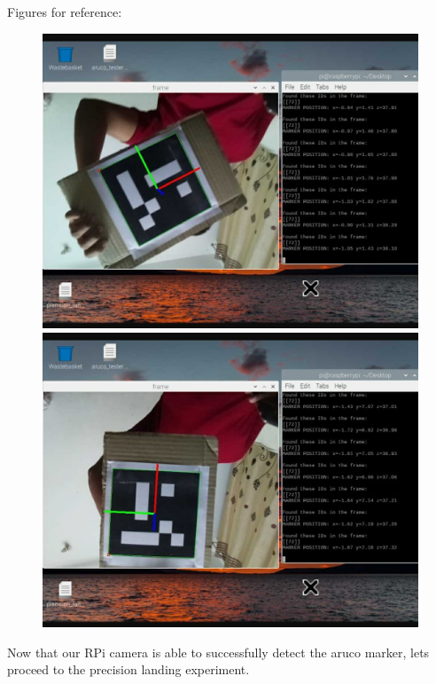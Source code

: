 \documentclass{article}
\begin{document}
Figures for reference:
\begin{figure}[!htb]
              \includegraphics[width=\linewidth]{./figs/images/aruco1.jpeg}
            \endminipage\hfill
              \includegraphics[width=\linewidth]{./figs/images/aruco2.jpeg}
            \endminipage
\end{figure}

Now that our RPi camera is able to successfully detect the aruco marker, lets proceed to the precision landing experiment.
\end{document}
